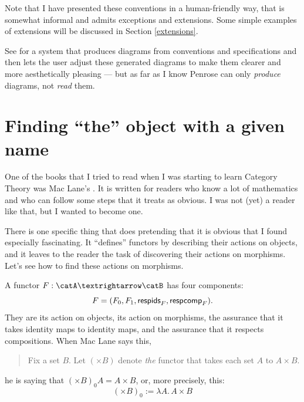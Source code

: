 \documentclass[oneside,12pt]{article}
\begin{document}

Note that I have presented these conventions in a human-friendly way,
that is somewhat informal and admits exceptions and extensions. Some
simple examples of extensions will be discussed in Section
\ref{extensions}.

See \cite{PenroseSIGGRAPH2020} for a system that produces diagrams
from conventions and specifications and then lets the user adjust
these generated diagrams to make them clearer and more aesthetically
pleasing --- but as far as I know Penrose can only {\sl produce}
diagrams, not {\sl read} them.







%                                                                   
\section{Finding ``the'' object with a given name \DONE}
\label{to-deserve-a-name}

One of the books that I tried to read when I was starting to learn
Category Theory was Mac Lane's \cite{CWM2}. It is written for readers
who know a lot of mathematics and who can follow some steps that it
treats as obvious. I was not (yet) a reader like that, but I wanted to
become one.

There is one specific thing that \cite{CWM2} does pretending that it
is obvious that I found especially fascinating. It ``defines''
functors by describing their actions on objects, and it leaves to the
reader the task of discovering their actions on morphisms. Let's see
how to find these actions on morphisms.

A functor $F:\catA→\catB$ has four components:
%
$$F=(F_0, F_1, \mathsf{respids}_F, \mathsf{respcomp}_F).$$
%
They are its action on objects, its action on morphisms, the assurance
that it takes identity maps to identity maps, and the assurance that
it respects compositions. When Mac Lane says this,
%
\begin{quote}
Fix a set $B$. Let $(×B)$ denote {\sl the} functor that takes each set
$A$ to $A×B$.
\end{quote}
%
he is saying that $(×B)_0 A = A×B$, or, more precisely, this:
%
$$(×B)_0 := λA.\,A×B$$
\end{document}
